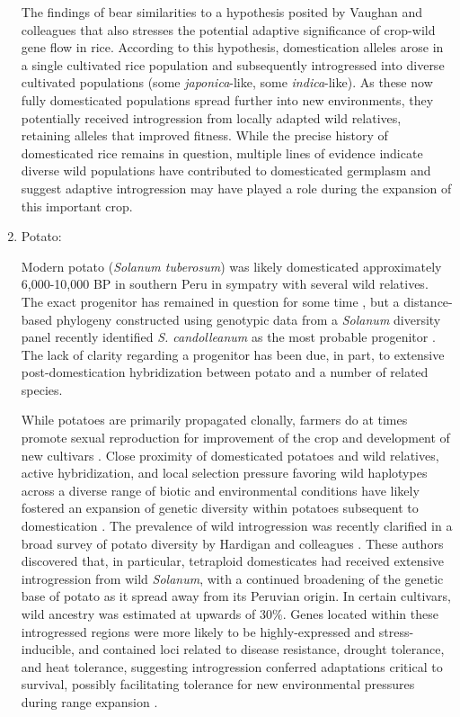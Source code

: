 \documentclass[11pt]{article}
\begin{document}
\begin{enumerate}
The findings of \cite{choi2018multiple} bear similarities to a hypothesis posited by Vaughan and colleagues \cite{vaughan2008evolving} that also stresses the potential adaptive significance of crop-wild gene flow in rice.
According to this hypothesis, domestication alleles arose in a single cultivated rice population and subsequently introgressed into diverse cultivated populations (some \emph{japonica}-like, some \emph{indica}-like).
As these now fully domesticated populations spread further into new environments, they potentially received introgression from locally adapted wild relatives, retaining alleles that improved fitness.
While the precise history of domesticated rice remains in question, multiple lines of evidence indicate diverse wild populations have contributed to domesticated germplasm and suggest adaptive introgression may have played a role during the expansion of this important crop.

\item{Potato:}

Modern potato (\emph{Solanum tuberosum}) was likely domesticated approximately 6,000-10,000 BP in southern Peru in sympatry with several wild relatives.
The exact progenitor has remained in question for some time \cite{spooner2005single, pickersgill1977origins, hawkes1988evolution}, but a distance-based phylogeny constructed using genotypic data from a \emph{Solanum} diversity panel recently identified \emph{S. candolleanum} as the most probable progenitor \cite{hardigan2015taxonomy}.
The lack of clarity regarding a progenitor has been due, in part, to extensive post-domestication hybridization between potato and a number of related species.

While potatoes are primarily propagated clonally, farmers do at times promote sexual reproduction for improvement of the crop and development of new cultivars \cite{quiros1992increase}.
Close proximity of domesticated potatoes and wild relatives, active hybridization, and local selection pressure favoring wild haplotypes across a diverse range of biotic and environmental conditions have likely fostered an expansion of genetic diversity within potatoes subsequent to domestication \cite{brush1995potato}.
The prevalence of wild introgression was recently clarified in a broad survey of potato diversity by Hardigan and colleagues \cite{hardigan2017genome}.
These authors discovered that, in particular, tetraploid domesticates had received extensive introgression from wild \emph{Solanum}, with a continued broadening of the genetic base of potato as it spread away from its Peruvian origin.
In certain cultivars, wild ancestry was estimated at upwards of 30\%.
Genes located within these introgressed regions were more likely to be highly-expressed and stress-inducible, and contained loci related to disease resistance, drought tolerance, and heat tolerance, suggesting introgression conferred adaptations critical to survival, possibly facilitating tolerance for new environmental pressures during range expansion \cite{hardigan2017genome}.
\end{enumerate}
\end{document}
